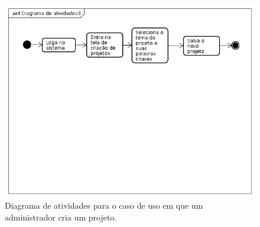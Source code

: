 \begin{figure}[hb]
    \begin{center}
        \includegraphics[scale=0.5]{img/atividade3.png}
        \caption{Diagrama de atividades para o caso de uso em que um
            administrador cria um projeto.}
        \label{fig:atividade-cria}
    \end{center}
\end{figure}
